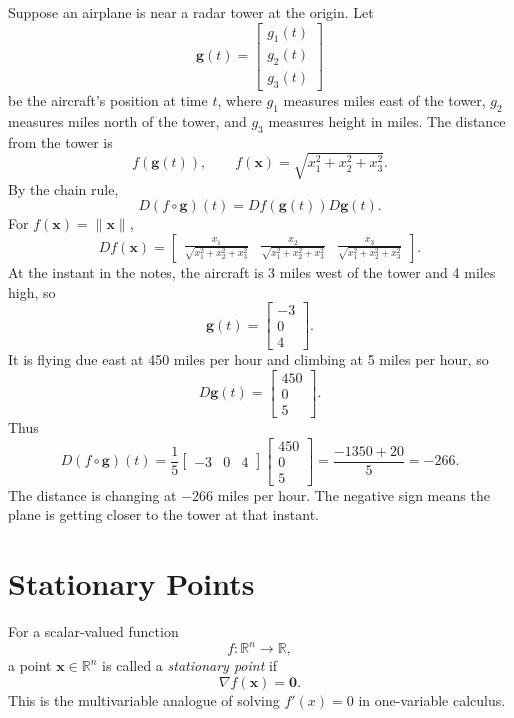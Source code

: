 Suppose an airplane is near a radar tower at the origin. Let
\[
    \mathbf{g}(t)=\begin{bmatrix}g_1(t)\\g_2(t)\\g_3(t)\end{bmatrix}
\]
be the aircraft's position at time \(t\), where \(g_1\) measures miles east of the tower, \(g_2\) measures miles north of the tower, and \(g_3\) measures height in miles. The distance from the tower is
\[
    f(\mathbf{g}(t)),
    \qquad
    f(\mathbf{x})=\sqrt{x_1^2+x_2^2+x_3^2}.
\]
By the chain rule,
\[
    D(f\circ \mathbf{g})(t)=Df(\mathbf{g}(t))D\mathbf{g}(t).
\]
For \(f(\mathbf{x})=\|\mathbf{x}\|\),
\[
    Df(\mathbf{x})=\begin{bmatrix}
        \frac{x_1}{\sqrt{x_1^2+x_2^2+x_3^2}} &
        \frac{x_2}{\sqrt{x_1^2+x_2^2+x_3^2}} &
        \frac{x_3}{\sqrt{x_1^2+x_2^2+x_3^2}}
    \end{bmatrix}.
\]
At the instant in the notes, the aircraft is 3 miles west of the tower and 4 miles high, so
\[
    \mathbf{g}(t)=\begin{bmatrix}-3\\0\\4\end{bmatrix}.
\]
It is flying due east at 450 miles per hour and climbing at 5 miles per hour, so
\[
    D\mathbf{g}(t)=\begin{bmatrix}450\\0\\5\end{bmatrix}.
\]
Thus
\[
    D(f\circ \mathbf{g})(t)
    =\frac{1}{5}\begin{bmatrix}-3&0&4\end{bmatrix}
    \begin{bmatrix}450\\0\\5\end{bmatrix}
    =\frac{-1350+20}{5}
    =-266.
\]
The distance is changing at \(-266\) miles per hour. The negative sign means the plane is getting closer to the tower at that instant.

\section{Stationary Points}
\label{mf:stationary-points}

For a scalar-valued function
\[
    f:\mathbb{R}^n\to\mathbb{R},
\]
a point \(\mathbf{x}\in\mathbb{R}^n\) is called a \emph{stationary point} if
\[
    \nabla f(\mathbf{x})=\mathbf{0}.
\]
This is the multivariable analogue of solving \(f'(x)=0\) in one-variable calculus.

